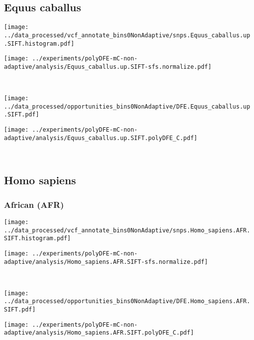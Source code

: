 \subsection{Equus caballus}

\begin{minipage}{0.49\linewidth}
    \texttt{[image: ../data\_processed/vcf\_annotate\_bins0NonAdaptive/snps.Equus\_caballus.up.SIFT.histogram.pdf]}
\end{minipage}
\begin{minipage}{0.49\linewidth}
    \texttt{[image: ../experiments/polyDFE-mC-non-adaptive/analysis/Equus\_caballus.up.SIFT-sfs.normalize.pdf]}
\end{minipage}
\\
\begin{minipage}{0.49\linewidth}
    \texttt{[image: ../data\_processed/opportunities\_bins0NonAdaptive/DFE.Equus\_caballus.up.SIFT.pdf]}
\end{minipage}
\begin{minipage}{0.49\linewidth}
    \texttt{[image: ../experiments/polyDFE-mC-non-adaptive/analysis/Equus\_caballus.up.SIFT.polyDFE\_C.pdf]}
\end{minipage}
\\

\subsection{Homo sapiens}

\subsubsection{African (AFR)}

\begin{minipage}{0.49\linewidth}
    \texttt{[image: ../data\_processed/vcf\_annotate\_bins0NonAdaptive/snps.Homo\_sapiens.AFR.SIFT.histogram.pdf]}
\end{minipage}
\begin{minipage}{0.49\linewidth}
    \texttt{[image: ../experiments/polyDFE-mC-non-adaptive/analysis/Homo\_sapiens.AFR.SIFT-sfs.normalize.pdf]}
\end{minipage}
\\
\begin{minipage}{0.49\linewidth}
    \texttt{[image: ../data\_processed/opportunities\_bins0NonAdaptive/DFE.Homo\_sapiens.AFR.SIFT.pdf]}
\end{minipage}
\begin{minipage}{0.49\linewidth}
    \texttt{[image: ../experiments/polyDFE-mC-non-adaptive/analysis/Homo\_sapiens.AFR.SIFT.polyDFE\_C.pdf]}
\end{minipage}
\\

